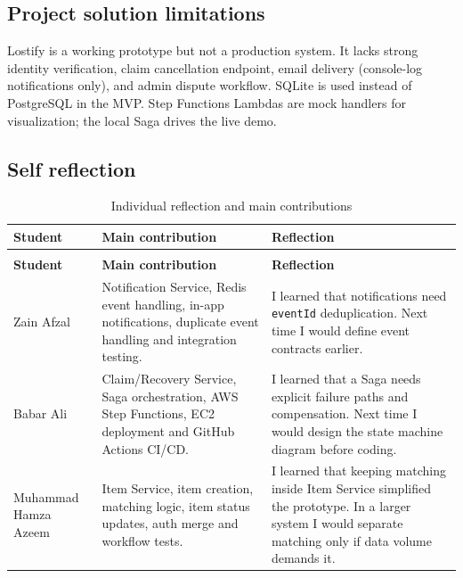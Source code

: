 \documentclass[11pt,a4paper]{article}
\begin{document}
\subsection{Project solution limitations}

Lostify is a working prototype but not a production system. It lacks strong identity verification,
claim cancellation endpoint, email delivery (console-log notifications only), and admin dispute workflow.
SQLite is used instead of PostgreSQL in the MVP. Step Functions Lambdas are mock handlers for
visualization; the local Saga drives the live demo.

\subsection{Self reflection}

\begingroup
\small
\renewcommand{\arraystretch}{1.45}
\setlength{\tabcolsep}{7pt}

\begin{longtable}{
@{}
>{\raggedright\arraybackslash}p{2.9cm}
>{\raggedright\arraybackslash}p{5.5cm}
>{\raggedright\arraybackslash}p{5.3cm}
@{}
}
\caption{Individual reflection and main contributions}
\label{tab:reflection} \\

\toprule
\textbf{Student} & \textbf{Main contribution} & \textbf{Reflection} \\
\midrule
\endfirsthead

\multicolumn{3}{c}{\tablename\ \thetable\ -- continued} \\
\toprule
\textbf{Student} & \textbf{Main contribution} & \textbf{Reflection} \\
\midrule
\endhead

Zain Afzal &
Notification Service, Redis event handling, in-app notifications, duplicate event handling and integration testing. &
I learned that notifications need \texttt{eventId} deduplication. Next time I would define event contracts earlier. \\[0.8em]

Babar Ali &
Claim/Recovery Service, Saga orchestration, AWS Step Functions, EC2 deployment and GitHub Actions CI/CD. &
I learned that a Saga needs explicit failure paths and compensation. Next time I would design the state machine diagram before coding. \\[0.8em]

Muhammad Hamza Azeem &
Item Service, item creation, matching logic, item status updates, auth merge and workflow tests. &
I learned that keeping matching inside Item Service simplified the prototype. In a larger system I would separate matching only if data volume demands it. \\

\bottomrule
\end{longtable}
\endgroup
\end{document}
